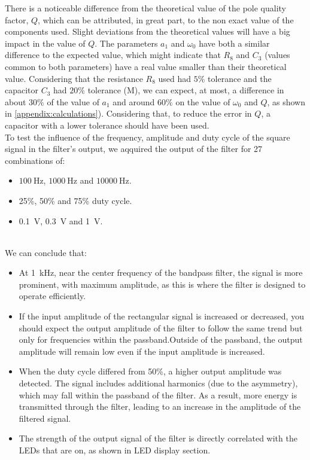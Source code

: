 \documentclass[lettersize,journal]{IEEEtran}
\begin{document}
There is a noticeable difference from the theoretical value of the pole quality factor, $Q$, which can be attributed, in great part, to the non exact value of the components used. Slight deviations from the theoretical values will have a big impact in the value of $Q$. The parameters $a_1$ and $\omega_0$ have both a similar difference to the expected value, which might indicate that $R_8$ and $C_3$ (values common to both parameters) have a real value smaller than their theoretical value. Considering that the resistance $R_8$ used had $5\%$ tolerance and the capacitor $C_3$ had $20\%$ tolerance (M), we can expect, at most, a difference in about $30\%$ of the value of $a_1$ and around $60\%$ on the value of $\omega_0$ and $Q$, as shown in \ref{appendix:calculations}). Considering that, to reduce the error in $Q$, a capacitor with a lower tolerance should have been used.\\

To test the influence of the frequency, amplitude and duty cycle of the square signal in the filter's output, we aqquired the output of the filter for 27 combinations of:
\begin{itemize}
    \item $\SI{100}{\hertz}$, $\SI{1000}{\hertz}$ and $\SI{10000}{\hertz}$.
    \item 25\%, 50\% and 75\% duty cycle.
    \item \SI{0.1}{\volt}, \SI{0.3}{\volt} and \SI{1}{\volt}.
\end{itemize}\\

We can conclude that:

\begin{itemize}
    \item At \SI{1}{\kilo \hertz}, near the center frequency of the bandpass filter, the signal is more prominent, with maximum amplitude, as this is where the filter is designed to operate efficiently.
    \item If the input amplitude of the rectangular signal is increased or decreased, you should expect the output amplitude of the filter to follow the same trend but only for frequencies within the passband.Outside of the passband, the output amplitude will remain low even if the input amplitude is increased.
    \item When the duty cycle differed from 50\%, a higher output amplitude was detected. The signal includes additional harmonics (due to the asymmetry), which may fall within the passband of the filter. As a result, more energy is transmitted through the filter, leading to an increase in the amplitude of the filtered signal. 
    \item The strength of the output signal of the filter is directly correlated with the LEDs that are on, as shown in LED display section.
\end{itemize}
\end{document}
